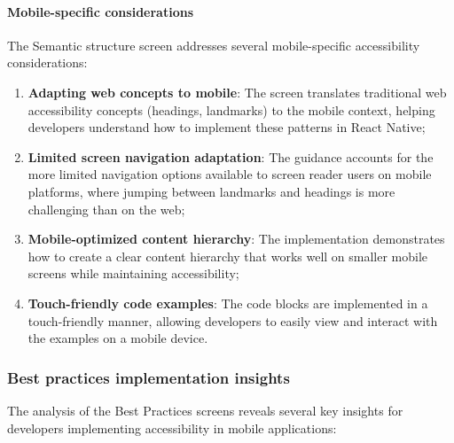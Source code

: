 \paragraph{Mobile-specific considerations}

The Semantic structure screen addresses several mobile-specific accessibility considerations:

\begin{enumerate}
    \item \textbf{Adapting web concepts to mobile}: The screen translates traditional web accessibility concepts (headings, landmarks) to the mobile context, helping developers understand how to implement these patterns in React Native;
    
    \item \textbf{Limited screen navigation adaptation}: The guidance accounts for the more limited navigation options available to screen reader users on mobile platforms, where jumping between landmarks and headings is more challenging than on the web;
    
    \item \textbf{Mobile-optimized content hierarchy}: The implementation demonstrates how to create a clear content hierarchy that works well on smaller mobile screens while maintaining accessibility;
    
    \item \textbf{Touch-friendly code examples}: The code blocks are implemented in a touch-friendly manner, allowing developers to easily view and interact with the examples on a mobile device.
\end{enumerate}

\subsubsection{Best practices implementation insights}
\label{subsubsec:best-practices-insights}

The analysis of the Best Practices screens reveals several key insights for developers implementing accessibility in mobile applications:

